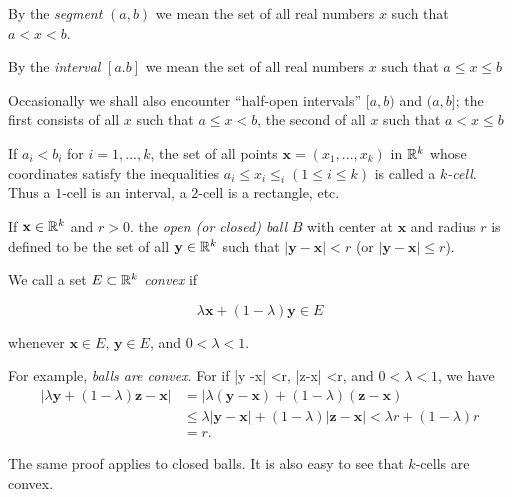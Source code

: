 \begin{mydef}\label{mydef:2.17}
By the \emph{segment} $(a, b)$ we mean the set of all real numbers $x$
such that $a < x <b$.

By the \emph{interval} $[a. b]$ we mean the set of all real numbers $x$ such that $a \leq x \leq b$

Occasionally we shall also encounter ``half-open intervals'' $[a, b)$ and $(a, b]$; the first consists of all $x$ such that $a \leq x < b$, the second of all $x$ such that $a < x \leq b$
\end{mydef}

If $a_i <b_i$ for $i=1,...,k$, the set of all points $\mathbf{x} =(x_1, ..., x_k)$ in ${\protect\mathbb R}^k$ whose coordinates satisfy the inequalities $a_i \leq x_i \leq _i (1 \leq i \leq k)$ is called a \emph{$k$-cell}.\\
Thus a $1$-cell is an interval, a $2$-cell is a rectangle, etc.

If $\mathbf{x}\in {\protect\mathbb R}^k$ and $r > 0$. the \emph{open (or closed) ball} $B$ with center at $\mathbf{x}$ and radius $r$ is defined to be the set of all $\mathbf{y} \in {\protect\mathbb R}^k$ such that $|\mathbf{y} - \mathbf{x}| <r$ (or $|\mathbf{y} - \mathbf{x}| \leq r$).

We call a set $E \subset {\protect\mathbb R}^k$ \emph{convex} if

\begin{equation*}
    \lambda\mathbf{x} + (1 - \lambda)\mathbf{y} \in E
\end{equation*}

whenever $\mathbf{x} \in E$, $\mathbf{y} \in E$, and $0 < \lambda < 1$.

For example, \emph{balls are convex}. For if |y -x| <r, |z-x| <r, and
$0 < \lambda <1$, we have
\begin{align*}
    |\lambda \mathbf{y} + (1-\lambda) \mathbf{z} - \mathbf{x}|
    & = |\lambda (\mathbf{y} - \mathbf{x}) + (1 - \lambda)(\mathbf{z} - \mathbf{x})\\
    & \leq \lambda |\mathbf{y} - \mathbf{x}| + (1 - \lambda)|\mathbf{z} - \mathbf{x}| < \lambda r + (1 - \lambda)r\\
    & = r.
\end{align*}

The same proof applies to closed balls. It is also easy to see that $k$-cells are convex.


